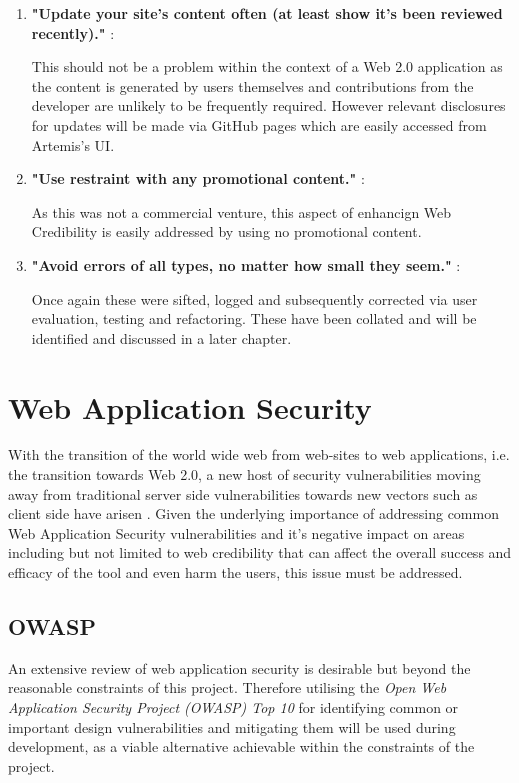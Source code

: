 \begin{enumerate}
    \item \textbf{"Update your site's content often (at least show it's been reviewed recently)."} \cite{Fogg2002a}:
    
    This should not be a problem within the context of a Web 2.0 application as the content is generated by users themselves and contributions from the developer are unlikely to be frequently required. However relevant disclosures for updates will be made via GitHub pages which are easily accessed from Artemis's UI.
    
    \item \textbf{"Use restraint with any promotional content."} \cite{Fogg2002a}:
    
    As this was not a commercial venture, this aspect of enhancign Web Credibility is easily addressed by using no promotional content.
    
    \item \textbf{"Avoid errors of all types, no matter how small they seem."} \cite{Fogg2002a}:
    
    Once again these were sifted, logged and subsequently corrected via user evaluation, testing and refactoring. These have been collated and will be identified and discussed in a later chapter.
\end{enumerate}
\newpage


\section{Web Application Security}

With the transition of the world wide web from web-sites to web applications, i.e. the transition towards Web 2.0, a new host of security vulnerabilities moving away from traditional server side vulnerabilities towards new vectors such as client side have arisen \cite{Dayfdd2011}. Given the underlying importance of addressing common Web Application Security vulnerabilities \cite{Dayfdd2011} and it's negative impact on areas including but not limited to web credibility \cite{Fogg2002a,Fogg1999} that can affect the overall success and efficacy of the tool and even harm the users, this issue must be addressed.

\subsection{OWASP}

An extensive review of web application security is desirable but beyond the reasonable constraints of this project. Therefore  utilising the \textit{Open Web Application Security Project (OWASP) Top 10} \cite{OWASP2017} for identifying common or important design vulnerabilities and mitigating them will be used during development, as a viable alternative achievable within the constraints of the project.

